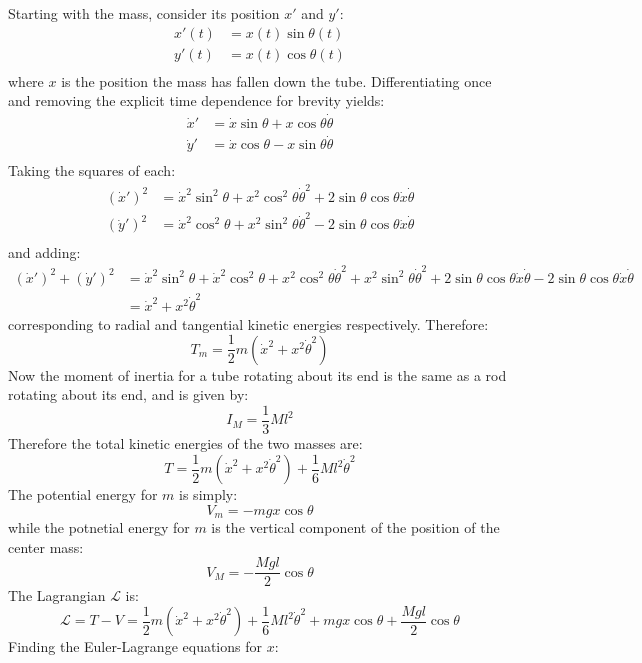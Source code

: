 \documentclass[9pt]{report}
\begin{document}
\begin{enumerate}
Starting with the mass, consider its position $x'$ and $y'$:
\[
\begin{align}
x'(t) &= x(t) \sin \theta(t) \\
y'(t) &= x(t) \cos \theta(t) \\
\end{align}
\]
where $x$ is the position the mass has fallen down the tube. Differentiating
once and removing the explicit time dependence for brevity yields:
\[
\begin{align}
\dot{x}' &= \dot{x} \sin \theta + x \cos \theta \dot{\theta}\\
\dot{y}' &= \dot{x} \cos \theta - x \sin \theta \dot{\theta } \\
\end{align}
\]
Taking the squares of each:
\[
\begin{align}
(\dot{x}')^2 &= \dot{x}^2 \sin^2 \theta + x^2 \cos^2 \theta \dot{\theta}^2 + 2\sin \theta \cos \theta \dot{x} \dot{\theta} \\
(\dot{y}')^2 &= \dot{x}^2 \cos^2 \theta + x^2 \sin^2 \theta \dot{\theta }^2 - 2\sin \theta \cos \theta \dot{x} \dot{\theta} \\
\end{align}
\]
and adding:
\[
\begin{align}
(\dot{x}')^2 + (\dot{y}')^2 &= \dot{x}^2 \sin^2 \theta + \dot{x}^2 \cos^2 \theta + x^2 \cos^2 \theta \dot{\theta}^2 + x^2 \sin^2 \theta \dot{\theta }^2 + 2\sin \theta \cos \theta \dot{x} \dot{\theta} - 2\sin \theta \cos \theta \dot{x} \dot{\theta} \\
&=  \dot{x}^2 + x^2\dot{\theta}^2
\end{align}
\]
corresponding to radial and tangential kinetic energies respectively.
Therefore:
\[
T_m = \frac{1}{2} m (\dot{x}^2 + x^2\dot{\theta}^2)
\]
Now the moment of inertia for a tube rotating about its end is the same as
a rod rotating about its end, and is given by:
\[
I_M = \frac{1}{3} M l^2
\]
Therefore the total kinetic energies of the two masses are:
\[
T = \frac{1}{2} m (\dot{x}^2 + x^2\dot{\theta}^2) + \frac{1}{6}  M l^2 \dot{\theta}^2
\]
The potential energy for $m$ is simply:
\[
V_m = -mgx\cos\theta
\]
while the potnetial energy for $m$ is the vertical component of the position of
the center mass:
\[
V_M = -\frac{Mgl}{2}\cos\theta
\]
The Lagrangian $\mathcal{L}$ is:
\[
\mathcal{L} = T - V = \frac{1}{2} m (\dot{x}^2 + x^2\dot{\theta}^2) + \frac{1}{6}  M l^2 \dot{\theta}^2 + mgx\cos\theta + \frac{Mgl}{2}\cos\theta
\]
Finding the Euler-Lagrange equations for $x$:
\[
\begin{align}

\end{align}\]
\end{enumerate}
\end{document}
